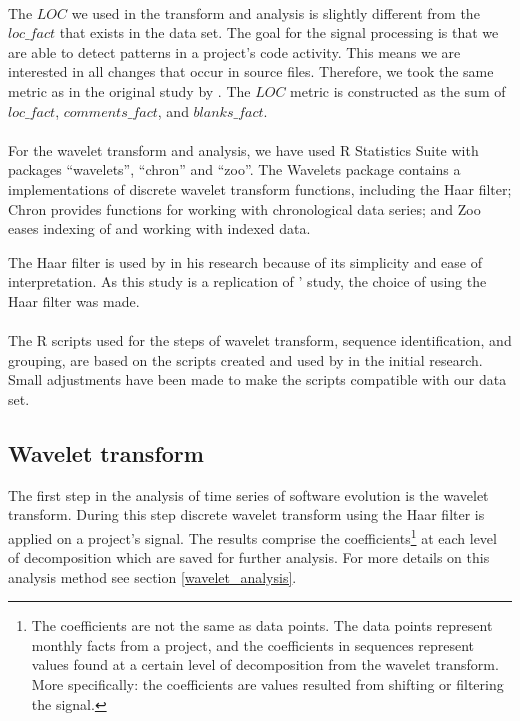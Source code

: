 

\paragraph{}
The $LOC$ we used in the transform and analysis is slightly different from the
$loc\_fact$ that exists in the data set. The goal for the signal processing is
that we are able to detect patterns in a project's code activity. This means we
are interested in all changes that occur in source files. Therefore, we took
the same metric as in the original study by \citet{karus2013}. The $LOC$ metric
is constructed as the sum of $loc\_fact$, $comments\_fact$, and $blanks\_fact$.

\paragraph{}
For the wavelet transform and analysis, we have used R Statistics Suite
with packages ``wavelets'', ``chron'' and ``zoo''. The Wavelets package
contains a implementations of discrete wavelet transform functions, including
the Haar filter; Chron provides functions for working with chronological data
series; and Zoo eases indexing of and working with indexed data.

The Haar filter is used by \citet{karus2013} in his research because of its
simplicity and ease of interpretation. As this study is a replication of
\citeauthor{karus2013}' study, the choice of using the Haar filter was made.

\paragraph{}
The R scripts used for the steps of wavelet transform, sequence identification,
and grouping, are based on the scripts created and used by
\citeauthor{karus2013} in the initial research. Small adjustments have been
made to make the scripts compatible with our data set.

\subsection{Wavelet transform}
The first step in the analysis of time series of software evolution is the
wavelet transform. During this step discrete wavelet transform using the Haar
filter is applied on a project's signal. The results comprise the
coefficients\footnote{The coefficients are not the same as data points. The
data points represent monthly facts from a project, and the coefficients in
sequences represent values found at a certain level of decomposition from the
wavelet transform. More specifically: the coefficients are values resulted from
shifting or filtering the signal.} at each level of decomposition which are
saved for further analysis. For more details on this analysis method see
section \ref{wavelet_analysis}.

